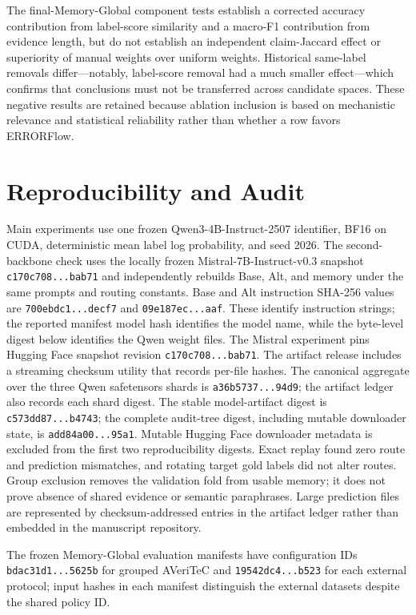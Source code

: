 \documentclass[runningheads]{llncs}
\begin{document}
The final-Memory-Global component tests establish a corrected accuracy contribution from
label-score similarity and a macro-F1 contribution from evidence length, but
do not establish an independent claim-Jaccard effect or superiority of manual
weights over uniform weights. Historical same-label removals differ---notably,
label-score removal had a much smaller effect---which confirms that conclusions
must not be transferred across candidate spaces. These negative results are
retained because ablation inclusion is based on mechanistic relevance and
statistical reliability rather than whether a row favors ERRORFlow.

\section{Reproducibility and Audit}

Main experiments use one frozen Qwen3-4B-Instruct-2507 identifier, BF16 on
CUDA, deterministic mean label log probability, and seed 2026. The
second-backbone check uses the locally frozen Mistral-7B-Instruct-v0.3
snapshot \texttt{c170c708...bab71} and independently rebuilds Base, Alt, and
memory under the same prompts and routing constants. Base and Alt instruction
SHA-256 values are \texttt{700ebdc1...decf7} and
\texttt{09e187ec...aaf}. These identify instruction strings; the reported
manifest model hash identifies the model name, while the byte-level digest
below identifies the Qwen weight files. The Mistral experiment
pins Hugging Face snapshot revision \texttt{c170c708...bab71}. The artifact
release includes a streaming checksum utility that records per-file hashes.
The canonical aggregate over the three Qwen safetensors shards is
\texttt{a36b5737...94d9}; the artifact ledger also records each shard digest.
The stable model-artifact digest is \texttt{c573dd87...b4743}; the complete
audit-tree digest, including mutable downloader state, is
\texttt{add84a00...95a1}. Mutable Hugging Face downloader metadata is excluded
from the first two reproducibility digests.
Exact replay found
zero route and prediction mismatches, and rotating target gold labels did not
alter routes. Group exclusion removes the validation fold from usable memory;
it does not prove absence of shared evidence or semantic paraphrases. Large
prediction files are represented by checksum-addressed entries in the
artifact ledger rather than embedded in the manuscript repository.

The frozen Memory-Global evaluation manifests have configuration IDs
\texttt{bdac31d1...5625b} for grouped AVeriTeC and
\texttt{19542dc4...b523} for each external protocol; input hashes in each
manifest distinguish the external datasets despite the shared policy ID.
\end{document}
